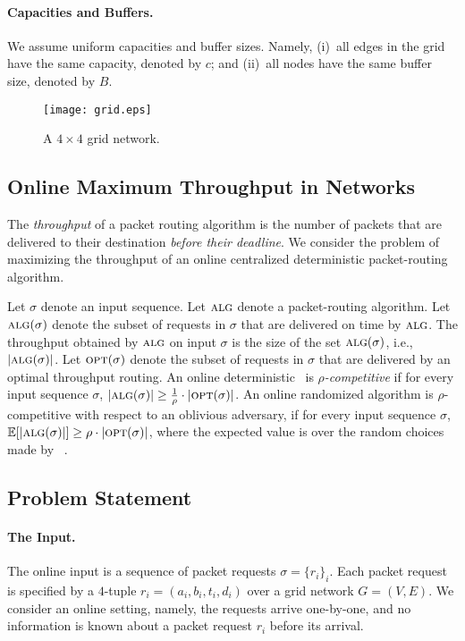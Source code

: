 \documentclass[11pt]{article}
\newcommand{\opt}{\text{\textsc{opt}}}
\newcommand{\alg}{\text{\sc{alg}}}
\newenvironment{proof sketch}[1]{\noindent {\emph{Proof sketch of #1:}}}{\hfill \qed}
\begin{document}
\paragraph{Capacities and Buffers.}
We assume uniform capacities and buffer sizes. Namely, (i)~all edges in the grid have
the same capacity, denoted by $c$; and (ii)~all nodes have the same buffer size,
denoted by $B$.

  \begin{figure}[H]
    \begin{center}
      \texttt{[image: grid.eps]}
    \end{center}
    \caption{A $4\times 4$ grid network.}
    \label{fig:grid}
  \end{figure}

\subsection{Online Maximum Throughput in Networks}
The \emph{throughput} of a packet routing algorithm is the number of packets that are delivered to their destination \emph{before their deadline}.
We consider the problem of maximizing the throughput of an online centralized deterministic packet-routing algorithm.

Let $\sigma$ denote an input sequence. Let $\alg$ denote a packet-routing
algorithm. Let $\alg(\sigma)$ denote the subset of requests in $\sigma$ that
are delivered on time by $\alg$. The throughput obtained by $\alg$ on input
$\sigma$ is the size of the set $\alg(\sigma)$, i.e., $|\alg(\sigma)|$. Let
$\opt(\sigma)$ denote the subset of requests in $\sigma$ that are delivered
by an optimal throughput routing. An online deterministic \alg\ is
\emph{$\rho$-competitive} if for every input sequence $\sigma$,
$|\alg(\sigma)| \geq \frac 1\rho \cdot |\opt(\sigma)|$. An online randomized
algorithm is $\rho$-competitive with respect to an oblivious adversary, if
for every input sequence $\sigma$, $\mathbb{E}[|\alg(\sigma)|] \geq \rho \cdot
|\opt(\sigma)|$, where the expected value is over the random choices made by
\alg~\cite{be}.

\subsection{Problem Statement}\label{sec:problem statement}
\paragraph{The Input.}
The online input is a sequence of packet requests $\sigma = \{r_i\}_i$. Each
packet request is  specified by a $4$-tuple $r_i=(a_i,b_i,t_i,d_i)$ over a
grid network $G=(V,E)$. We consider an online setting, namely, the requests
arrive one-by-one, and no information is known about a packet request $r_i$
before its arrival.
\end{document}
